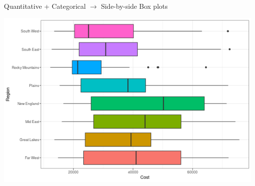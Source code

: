 \documentclass{beamer}
\begin{document}
\begin{frame}{Quantitative + Categorical $\rightarrow$ Side-by-side Box plots}
\begin{center}
\includegraphics[scale=0.5]{box_private2.png}
\end{center}
\end{frame}
\end{document}
